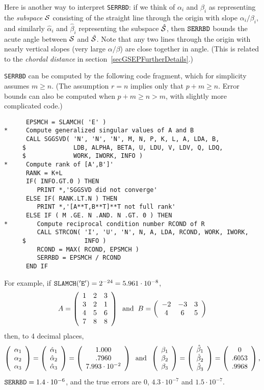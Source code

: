 Here is another way to interpret {\tt SERRBD}:
if we think of $\alpha_i$
and $\beta_i$ as representing the {\em subspace} $\cal S$
consisting of the straight line through the origin with slope
$\alpha_i / \beta_i$, and similarly $\hat{\alpha}_i$
and $\hat{\beta}_i$ representing the subspace $\hat{\cal S}$,
then ${\tt SERRBD}$ bounds the acute angle between
$\cal S$ and $\hat{\cal S}$.
Note that any two
lines through the origin with nearly vertical slopes
(very large $\alpha / \beta$) are close together in angle.
(This is related to the {\em chordal distance} in
section~\ref{secGSEPFurtherDetails}.)

{\tt SERRBD} can be computed by the following code fragment,
which for simplicity assumes $m \geq n$.
(The assumption $r=n$ implies only that $p+m \geq n$.
Error bounds can also be computed when $p+m \geq n > m$,
with slightly more complicated code.)

\begin{verbatim}
      EPSMCH = SLAMCH( 'E' )
*     Compute generalized singular values of A and B
      CALL SGGSVD( 'N', 'N', 'N', M, N, P, K, L, A, LDA, B,
     $             LDB, ALPHA, BETA, U, LDU, V, LDV, Q, LDQ,
     $             WORK, IWORK, INFO )
*     Compute rank of [A',B']'
      RANK = K+L
      IF( INFO.GT.0 ) THEN
         PRINT *,'SGGSVD did not converge'
      ELSE IF( RANK.LT.N ) THEN
         PRINT *,'[A**T,B**T]**T not full rank'
      ELSE IF ( M .GE. N .AND. N .GT. 0 ) THEN
*        Compute reciprocal condition number RCOND of R
         CALL STRCON( 'I', 'U', 'N', N, A, LDA, RCOND, WORK, IWORK,
     $                INFO )
         RCOND = MAX( RCOND, EPSMCH )
         SERRBD = EPSMCH / RCOND
      END IF
\end{verbatim}

For example, if
${\tt SLAMCH('E')} = 2^{-24} = 5.961 \cdot 10^{-8}$,
\[
A = \bmat{ccc} 1 & 2 & 3 \\ 3 & 2 & 1 \\ 4 & 5 & 6 \\ 7 & 8 & 8 \emat
\; \; {\rm and} \; \;
B = \bmat{ccc} -2 & -3 & 3 \\ 4 & 6 & 5 \emat
\]
then, to 4 decimal places,
\[
\bmat{c} \alpha_1 \\ \alpha_2 \\ \alpha_3 \emat =
\bmat{c} \hat{\alpha}_1 \\ \hat{\alpha}_2 \\ \hat{\alpha}_3 \emat =
\bmat{c} 1.000 \\ .7960 \\ 7.993 \cdot 10^{-2} \emat
\; \; {\rm and} \; \;
\bmat{c} \beta_1 \\ \beta_2 \\ \beta_3 \emat =
\bmat{c} \hat{\beta}_1 \\ \hat{\beta}_2 \\ \hat{\beta}_3 \emat =
\bmat{c} 0 \\ .6053 \\ .9968 \emat,
\]
${\tt SERRBD} = 1.4 \cdot 10^{-6}$, and the true errors
are $0$, $4.3 \cdot 10^{-7}$ and $1.5 \cdot 10^{-7}$.

